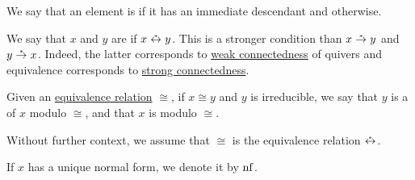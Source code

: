 \begin{definition}
\begin{thmenum}
    We say that an element is  if it has an immediate descendant and  otherwise.

     We say that \( x \) and \( y \) are  if \( x \reloset {*} \leftrightarrow y \). This is a stronger condition than \( x \reloset {*} \to y \) and \( y \reloset {*} \to x \). Indeed, the latter corresponds to \hyperref[def:quiver_connectedness/weak]{weak connectedness} of quivers and equivalence corresponds to \hyperref[def:quiver_connectedness/strong]{strong connectedness}.

     Given an \hyperref[def:equivalence_relation]{equivalence relation} \( \cong \), if \( x \cong y \) and \( y \) is irreducible, we say that \( y \) is a  of \( x \) modulo \( \cong \), and that \( x \) is  modulo \( \cong \).

    Without further context, we assume that \( \cong \) is the equivalence relation \( \reloset {*} \leftrightarrow \).

    If \( x \) has a unique normal form, we denote it by \( \operatorname{nf} \).
  \end{thmenum}
\end{definition}

